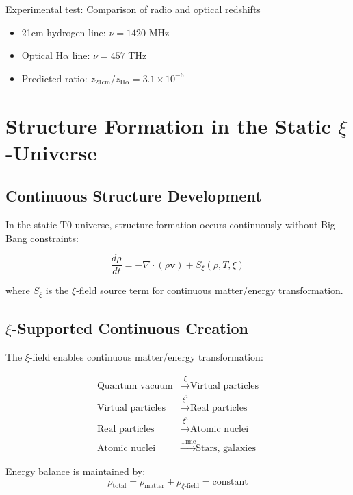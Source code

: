 \documentclass[12pt,a4paper]{article}
\begin{document}
	\begin{experiment}
		Experimental test: Comparison of radio and optical redshifts
		\begin{itemize}
			\item 21cm hydrogen line: $\nu = 1420$ MHz
			\item Optical H$\alpha$ line: $\nu = 457$ THz
			\item Predicted ratio: $z_{21\text{cm}}/z_{\text{H}\alpha} = 3.1 \times 10^{-6}$
		\end{itemize}
	\end{experiment}
	
	\section{Structure Formation in the Static $\xi$-Universe}
	
	\subsection{Continuous Structure Development}
	
	In the static T0 universe, structure formation occurs continuously without Big Bang constraints:
	
	\begin{equation}
		\frac{d\rho}{dt} = -\nabla \cdot (\rho \mathbf{v}) + S_\xi(\rho, T, \xi)
	\end{equation}
	
	where $S_\xi$ is the $\xi$-field source term for continuous matter/energy transformation.
	
	\subsection{$\xi$-Supported Continuous Creation}
	
	The $\xi$-field enables continuous matter/energy transformation:
	
	\begin{align}
		\text{Quantum vacuum} &\xrightarrow{\xi} \text{Virtual particles} \\
		\text{Virtual particles} &\xrightarrow{\xi^2} \text{Real particles} \\
		\text{Real particles} &\xrightarrow{\xi^3} \text{Atomic nuclei} \\
		\text{Atomic nuclei} &\xrightarrow{\text{Time}} \text{Stars, galaxies}
	\end{align}
	
	Energy balance is maintained by:
	\begin{equation}
		\rho_{\text{total}} = \rho_{\text{matter}} + \rho_{\xi\text{-field}} = \text{constant}
	\end{equation}
	
\end{document}
